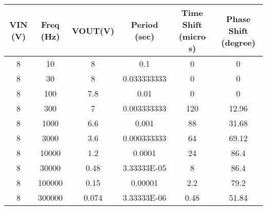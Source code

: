 \begin{tabular}{|c|c|c|c|c|c|}
\hline
VIN (V)&Freq (Hz)&VOUT(V)&Period (sec)&Time Shift (micro s)&Phase Shift (degree)\\
\hline
8&10&8&0.1&0&0\\
\hline
8&30&8&0.033333333&0&0\\
\hline
8&100&7.8&0.01&0&0\\
\hline
8&300&7&0.003333333&120&12.96\\
\hline
8&1000&6.6&0.001&88&31.68\\
\hline
8&3000&3.6&0.000333333&64&69.12\\
\hline
8&10000&1.2&0.0001&24&86.4\\
\hline
8&30000&0.48&3.33333E-05&8&86.4\\
\hline
8&100000&0.15&0.00001&2.2&79.2\\
\hline
8&300000&0.074&3.33333E-06&0.48&51.84\\
\hline
\end{tabular}
